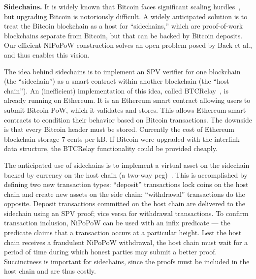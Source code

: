 \textbf{Sidechains.}
\label{sec.sidechains}
It is widely known that Bitcoin faces significant scaling
hurdles~\cite{onscaling}, but upgrading Bitcoin is notoriously difficult. A
widely anticipated solution is to treat the Bitcoin blockchain as a host for
``sidechains,'' which are proof-of-work blockchains separate from Bitcoin, but
that can be backed by Bitcoin deposits. Our efficient NIPoPoW construction
solves an open problem posed by Back et al., and thus enables this vision.

The idea behind sidechains is to implement an SPV verifier for one blockchain
(the ``sidechain'') as a smart contract within another blockchain (the ``host
chain''). An (inefficient) implementation of this idea, called
BTCRelay~\cite{ethereum}, is already running on Ethereum. It is an Ethereum
smart contract allowing users to submit Bitcoin PoW, which it validates and
stores. This allows Ethereum smart contracts to condition their behavior based
on Bitcoin transactions. The downside is that every Bitcoin header must be
stored. Currently the cost of Ethereum blockchain storage 7 cents per kB. If
Bitcoin were upgraded with the interlink data structure, the BTCRelay
functionality could be provided cheaply.

The anticipated use of sidechains is to implement a virtual asset on the
sidechain backed by currency on the host chain (a two-way
peg)~\cite{sidechains}. This is accomplished by defining two new transaction
types: ``deposit'' transactions lock coins on the host chain and create new
assets on the side chain; ``withdrawal'' transactions do the opposite. Deposit
transactions committed on the host chain are delivered to the sidechain using an
SPV proof; vice versa for withdrawal transactions. To confirm transaction
inclusion, NiPoPoW can be used with an infix predicate --- the predicate claims
that a transaction occurs at a particular height. Lest the host chain receives a
fraudulent NiPoPoW withdrawal, the host chain must wait for a period of time
during which honest parties may submit a better proof. Succinctness is important
for sidechains, since the proofs must be included in the host chain and are thus
costly.
